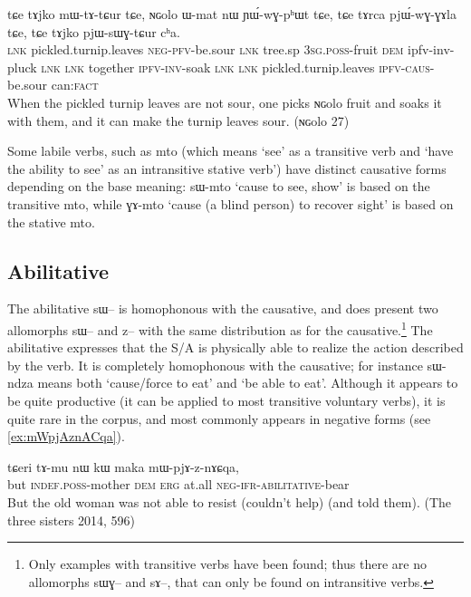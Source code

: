 \documentclass[oldfontcommands,oneside,a4paper,11pt]{article}
\newcommand{\ipa}[1]{{\phon \mbox{#1}}} %
\begin{document}
 \begin{exe}
\ex \label{ex:ngolo-tAjko}
\gll
\ipa{tɕe} 	\ipa{tɤjko} 	\ipa{mɯ-tɤ-tɕur} 	\ipa{tɕe,} 	\ipa{ɴɢolo} 	\ipa{ɯ-mat} 	\ipa{nɯ} 	\ipa{ɲɯ́-wɣ-pʰɯt} 	\ipa{tɕe,} 	\ipa{tɕe} 	\ipa{tɤrca} 	\ipa{pjɯ́-wɣ-ɣɤla} 	\ipa{tɕe,} 	\ipa{tɕe} 	\ipa{tɤjko} 	\ipa{pjɯ-sɯɣ-tɕur} 	\ipa{cʰa.} \\ 
\textsc{lnk} pickled.turnip.leaves \textsc{neg-pfv}-be.sour \textsc{lnk} tree.sp \textsc{3sg.poss}-fruit \textsc{dem} ipfv-inv-pluck \textsc{lnk} \textsc{lnk} together \textsc{ipfv-inv}-soak \textsc{lnk} \textsc{lnk}  pickled.turnip.leaves \textsc{ipfv-caus}-be.sour can\textsc{:fact} \\
 \glt When the pickled turnip leaves are not sour, one picks \ipa{ɴɢolo} fruit and soaks it with them, and it can make the turnip leaves sour.   (\ipa{ɴɢolo} 27)
   \end{exe}

Some labile verbs, such as \ipa{mto} (which means `see' as a transitive verb and `have the ability to see' as an intransitive stative verb') have distinct causative forms depending on the base meaning: \ipa{sɯ-mto} `cause to see, show' is based on the transitive \ipa{mto}, while \ipa{ɣɤ-mto} `cause (a blind person) to recover sight' is based on the stative \ipa{mto}.

\subsection{Abilitative}
The abilitative \ipa{sɯ--} is homophonous with the causative, and does   present two allomorphs \ipa{sɯ--} and \ipa{z--} with the same distribution as for the causative.\footnote{Only examples with transitive verbs have been found; thus there are no allomorphs \ipa{sɯɣ--} and \ipa{sɤ--}, that can only be found on intransitive verbs.} The abilitative expresses that the S/A is physically able to realize the action described by the verb. It is completely homophonous with the causative; for instance \ipa{sɯ-ndza} means both `cause/force to eat' and `be able to eat'. Although it appears to be quite productive (it can be applied to most transitive voluntary verbs), it is quite rare in the corpus, and most commonly appears in negative forms (see \ref{ex:mWpjAznACqa}).



 \begin{exe}
\ex \label{ex:mWpjAznACqa}
\gll
\ipa{tɕeri} 	\ipa{tɤ-mu} 	\ipa{nɯ} 	\ipa{kɯ} 	\ipa{maka} 	\ipa{mɯ-pjɤ-z-nɤɕqa,} \\
but \textsc{indef.poss}-mother \textsc{dem} \textsc{erg} at.all \textsc{neg-ifr-abilitative}-bear \\
\glt But the old woman was not able to resist (couldn't help) (and told them). (The three sisters 2014, 596)
   \end{exe}
\end{document}
